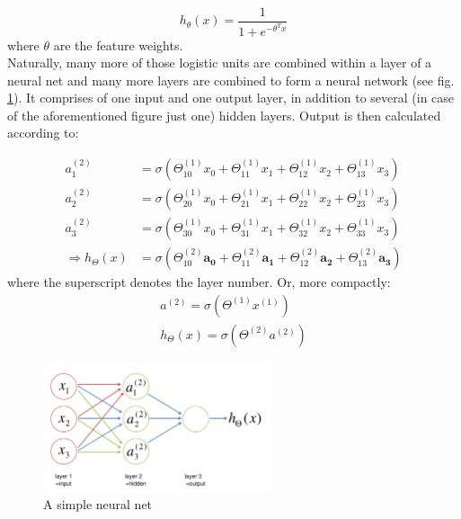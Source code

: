 \documentclass[a4paper, 11pt]{article}
\numberwithin{equation}{section}
\begin{document}
		\begin{equation}
		h_\theta (x) = \frac{1}{1+e^{-\theta ^ T x}}
		\end{equation}
		\noindent where $\theta$ are the feature weights.\\
		
		\noindent Naturally, many more of those logistic units are combined within a layer of a neural net and many more layers are combined to form a neural network (see fig. \ref{fig:neural_net}). It comprises of one input and one output layer, in addition to several (in case of the aforementioned figure just one) hidden layers. Output is then calculated according to:
		
		\begin{align}
		a_1^{(2)} &= \sigma (\Theta_{10}^{(1)} x_0 + \Theta_{11}^{(1)} x_1  + \Theta_{12}^{(1)} x_2  + \Theta_{13}^{(1)} x_3) \\
		a_2^{(2)} &= \sigma (\Theta_{20}^{(1)} x_0 + \Theta_{21}^{(1)} x_1  + \Theta_{22}^{(1)} x_2  + \Theta_{23}^{(1)} x_3) \\
		a_3^{(2)} &= \sigma (\Theta_{30}^{(1)} x_0 + \Theta_{31}^{(1)} x_1  + \Theta_{32}^{(1)} x_2  + \Theta_{33}^{(1)} x_3) \\
		\Rightarrow h_{\Theta} (x) &= \sigma (\Theta_{10}^{(2)} \boldsymbol{a_0} + \Theta_{11}^{(2)} \boldsymbol{a_1}  + \Theta_{12}^{(2)} \boldsymbol{a_2}  + \Theta_{13}^{(2)} \boldsymbol{a_3})
		\end{align}
		where the superscript denotes the layer number. Or, more compactly:
		\begin{align}
		a^{(2)} = \sigma(\Theta^{(1)} x^{(1)}) \\
		h_{\Theta}(x) = \sigma(\Theta^{(2)} a^{(2)})
		\end{align}
		
		\begin{figure}[!h]
			\centering
			\includegraphics[page=1,width=0.60\textwidth]{neural_net.pdf}
			\caption{\label{fig:neural_net}{A simple neural net}}
		\end{figure}
		
\end{document}
